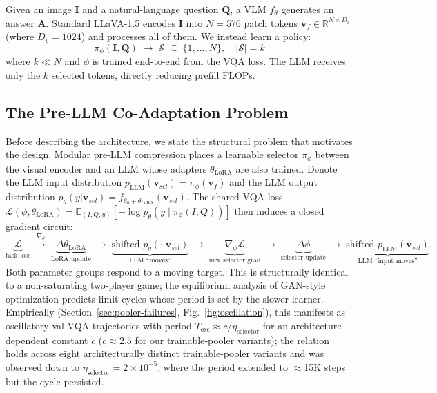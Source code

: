 \documentclass{article}
\newcommand{\vfine}{\mathbf{v}_{f}}
\newcommand{\vsel}{\mathbf{v}_{sel}}
\begin{document}
Given an image $\mathbf{I}$ and a natural-language question $\mathbf{Q}$,
a VLM $f_\theta$ generates an answer $\mathbf{A}$.
Standard LLaVA-1.5 encodes $\mathbf{I}$ into $N=576$ patch tokens
$\vfine \in \mathbb{R}^{N \times D_v}$ (where $D_v=1024$) and processes all of them.
We instead learn a policy:
\[
  \pi_\phi(\mathbf{I}, \mathbf{Q}) \;\to\; \mathcal{S} \;\subseteq\; \{1, \ldots, N\},
  \quad |\mathcal{S}| = k
\]
where $k \ll N$ and $\phi$ is trained end-to-end from the VQA loss.
The LLM receives only the $k$ selected tokens, directly reducing prefill FLOPs.

\subsection{The Pre-LLM Co-Adaptation Problem}
\label{sec:co-adaptation}

Before describing the architecture, we state the structural problem that
motivates the design. Modular pre-LLM compression places a learnable
selector $\pi_\phi$ between the visual encoder and an LLM whose adapters
$\theta_\text{LoRA}$ are also trained. Denote the LLM input distribution
$p_\text{LLM}(\vsel) = \pi_\phi(\vfine)$ and the LLM output distribution
$p_\theta(y|\vsel) = f_{\theta_0 + \theta_\text{LoRA}}(\vsel)$.
The shared VQA loss
$\mathcal{L}(\phi, \theta_\text{LoRA}) =
\mathbb{E}_{(I,Q,y)}[-\log p_\theta(y \mid \pi_\phi(I,Q))]$
then induces a closed gradient circuit:
\[
\underbrace{\mathcal{L}}_{\text{task loss}}
\;\xrightarrow{\nabla_\theta}\;
\underbrace{\Delta \theta_\text{LoRA}}_{\text{LoRA update}}
\;\to\;
\underbrace{\text{shifted } p_\theta(\cdot|\vsel)}_{\text{LLM ``moves''}}
\;\to\;
\underbrace{\nabla_\phi \mathcal{L}}_{\text{new selector grad}}
\;\to\;
\underbrace{\Delta \phi}_{\text{selector update}}
\;\to\;
\underbrace{\text{shifted } p_\text{LLM}(\vsel)}_{\text{LLM ``input moves''}}.
\]
Both parameter groups respond to a moving target. This is structurally
identical to a non-saturating two-player game; the equilibrium analysis
of GAN-style optimization
\cite{mescheder2018training,jolicoeur2018relativistic} predicts limit
cycles whose period is set by the slower learner. Empirically
(Section~\ref{sec:pooler-failures}, Fig.~\ref{fig:oscillation}), this
manifests as oscillatory val-VQA trajectories with period
$T_\text{osc} \approx c/\eta_\text{selector}$ for an architecture-dependent
constant $c$ ($c \approx 2.5$ for our trainable-pooler variants);
the relation holds across eight architecturally distinct
trainable-pooler variants and was observed down to
$\eta_\text{selector}{=}2{\times}10^{-5}$, where the period extended to
$\approx$15K steps but the cycle persisted.
\end{document}
